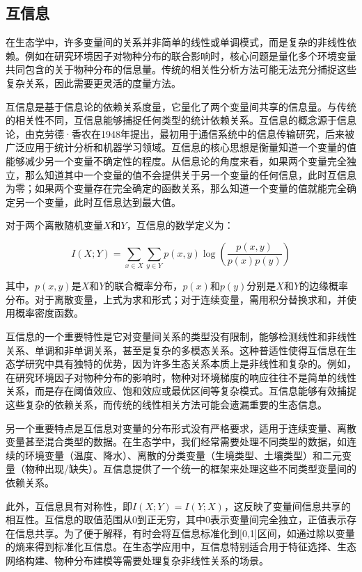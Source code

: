 \documentclass[
  twoside,12pt,fontset=none]{ctexbook}
\begin{document}
\hypertarget{ux4e92ux4fe1ux606f}{%
\subsection{互信息}\label{ux4e92ux4fe1ux606f}}

在生态学中，许多变量间的关系并非简单的线性或单调模式，而是复杂的非线性依赖。例如在研究环境因子对物种分布的联合影响时，核心问题是量化多个环境变量共同包含的关于物种分布的信息量。传统的相关性分析方法可能无法充分捕捉这些复杂关系，因此需要更灵活的度量方法。

互信息是基于信息论的依赖关系度量，它量化了两个变量间共享的信息量。与传统的相关性不同，互信息能够捕捉任何类型的统计依赖关系。互信息的概念源于信息论，由克劳德·香农在1948年提出，最初用于通信系统中的信息传输研究，后来被广泛应用于统计分析和机器学习领域。互信息的核心思想是衡量知道一个变量的值能够减少另一个变量不确定性的程度。从信息论的角度来看，如果两个变量完全独立，那么知道其中一个变量的值不会提供关于另一个变量的任何信息，此时互信息为零；如果两个变量存在完全确定的函数关系，那么知道一个变量的值就能完全确定另一个变量，此时互信息达到最大值。

对于两个离散随机变量\(X\)和\(Y\)，互信息的数学定义为：

\[I(X;Y) = \sum_{x\in X}\sum_{y\in Y} p(x,y) \log\left(\frac{p(x,y)}{p(x)p(y)}\right)\]

其中，\(p(x,y)\)是\(X\)和\(Y\)的联合概率分布，\(p(x)\)和\(p(y)\)分别是\(X\)和\(Y\)的边缘概率分布。对于离散变量，上式为求和形式；对于连续变量，需用积分替换求和，并使用概率密度函数。

互信息的一个重要特性是它对变量间关系的类型没有限制，能够检测线性和非线性关系、单调和非单调关系，甚至是复杂的多模态关系。这种普适性使得互信息在生态学研究中具有独特的优势，因为许多生态关系本质上是非线性和复杂的。例如，在研究环境因子对物种分布的影响时，物种对环境梯度的响应往往不是简单的线性关系，而是存在阈值效应、饱和效应或最优区间等复杂模式。互信息能够有效捕捉这些复杂的依赖关系，而传统的线性相关方法可能会遗漏重要的生态信息。

另一个重要特点是互信息对变量的分布形式没有严格要求，适用于连续变量、离散变量甚至混合类型的数据。在生态学中，我们经常需要处理不同类型的数据，如连续的环境变量（温度、降水）、离散的分类变量（生境类型、土壤类型）和二元变量（物种出现/缺失）。互信息提供了一个统一的框架来处理这些不同类型变量间的依赖关系。

此外，互信息具有对称性，即\(I(X;Y) = I(Y;X)\)，这反映了变量间信息共享的相互性。互信息的取值范围从0到正无穷，其中0表示变量间完全独立，正值表示存在信息共享。为了便于解释，有时会将互信息标准化到{[}0,1{]}区间，如通过除以变量的熵来得到标准化互信息。在生态学应用中，互信息特别适合用于特征选择、生态网络构建、物种分布建模等需要处理复杂非线性关系的场景。
\end{document}
